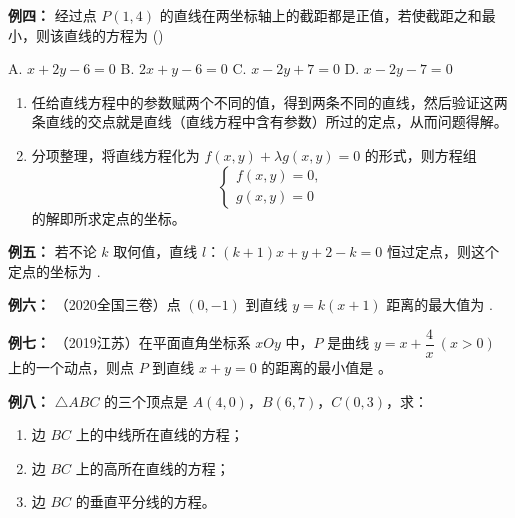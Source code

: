 \documentclass{article}
\begin{document}
\noindent\textbf{例四： }经过点 \(P(1,4)\) 的直线在两坐标轴上的截距都是正值，若使截距之和最小，则该直线的方程为 \hfill (\quad)

\vspace{0.5em}
\noindent
A. \(x + 2y - 6 = 0\) \quad
B. \(2x + y - 6 = 0\) \quad
C. \(x - 2y + 7 = 0\) \quad
D. \(x - 2y - 7 = 0\)
\vspace{2\baselineskip}

\begin{tcolorbox}[colback=blue!10,colframe=blue!70!black,title=解直线（直线方程中含有参数）过定点问题的方法]

\begin{enumerate}
    \item 任给直线方程中的参数赋两个不同的值，得到两条不同的直线，然后验证这两条直线的交点就是直线（直线方程中含有参数）所过的定点，从而问题得解。

    \item 分项整理，将直线方程化为 \(f(x,y) + \lambda g(x,y) = 0\) 的形式，则方程组
    \[
    \begin{cases}
    f(x,y) = 0, \\
    g(x,y) = 0
    \end{cases}
    \]
    的解即所求定点的坐标。
\end{enumerate}
\end{tcolorbox}
\vspace{2\baselineskip}

\noindent\textbf{例五： }若不论 \(k\) 取何值，直线 \(l\)：\((k+1)x + y + 2 - k = 0\) 恒过定点，则这个定点的坐标为 \underline{\qquad}.
\vspace{2\baselineskip}

\noindent\textbf{例六： }（2020全国三卷）点 \((0,-1)\) 到直线 \(y = k(x + 1)\) 距离的最大值为 \underline{\qquad}.

\vspace{2\baselineskip}

\noindent\textbf{例七： }（2019江苏）在平面直角坐标系 \(xOy\) 中，\(P\) 是曲线 \(y = x + \dfrac{4}{x}\ (x > 0)\) 上的一个动点，则点 \(P\) 到直线 \(x + y = 0\) 的距离的最小值是 \underline{\qquad}。
\vspace{2\baselineskip}



\noindent\textbf{例八： }\(\triangle ABC\) 的三个顶点是 \(A(4,0)\)，\(B(6,7)\)，\(C(0,3)\)，求：
\begin{enumerate}
    \item 边 \(BC\) 上的中线所在直线的方程；
    \item 边 \(BC\) 上的高所在直线的方程；
    \item 边 \(BC\) 的垂直平分线的方程。
\end{enumerate}
\vspace{10\baselineskip}
\end{document}
